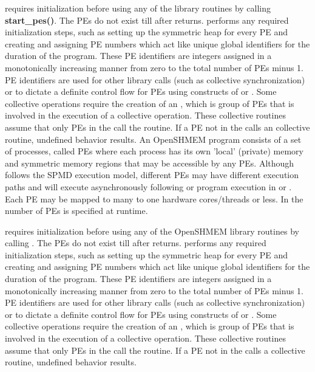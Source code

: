 \openshmem requires initialization before using any of the \openshmem library
routines by calling \textbf{start\_pes()}.  %
The \ac{PE}s do not exist till after  returns.  performs any required initialization steps, such as setting up the symmetric heap for every \ac{PE} and creating and assigning \ac{PE} numbers which act like unique global identifiers for the duration of the program. These \ac{PE} identifiers are integers assigned in a monotonically increasing manner from zero to the total number of \ac{PE}s minus 1. \ac{PE} identifiers are used for other \openshmem library calls (such as collective synchronization) or to dictate a definite control flow for \ac{PE}s using constructs of \Clang{} or \Fortran. Some collective operations require the creation of an \activeset, which is  group of \ac{PE}s that is involved in the execution of a collective operation. These collective routines assume that only \ac{PE}s in the \activeset{} call the routine. If a \ac{PE} not in the \activeset{} calls an \openshmem collective routine, undefined  behavior results.
An OpenSHMEM program consists of a set of processes, called \ac{PE}s where each process has its own 'local' (private) memory and symmetric memory regions that may be accessible by any \ac{PE}s.
Although \openshmem follows the \ac{SPMD} execution model, different \ac{PE}s may have different execution paths and will execute asynchronously following \Fortran{} or program execution in \Clang{} or \Cpp.  Each PE may be mapped to many to one hardware cores/threads or less. In \openshmem the number of \ac{PE}s is specified at runtime.

\openshmem requires initialization before using any of the OpenSHMEM library
routines by calling .%
The \ac{PE}s do not exist till after  returns.  performs any required initialization steps, such as setting up the symmetric heap for every \ac{PE} and creating and assigning \ac{PE} numbers 
which act like unique global identifiers for the duration of the program. These \ac{PE} identifiers are integers assigned in a monotonically increasing manner from zero to the total number of \ac{PE}s minus 1. \ac{PE} identifiers 
are used for other \openshmem library calls (such as collective synchronization) or to dictate a definite control flow for \ac{PE}s using constructs of \Clang{} or \Fortran{}. Some collective operations require the creation of an 
\activeset, which is  group of \ac{PE}s that is involved in the execution of a collective operation. These collective routines assume that only \ac{PE}s in the \activeset{} call the routine. If a \ac{PE} not in the \activeset{} calls a 
\openshmem collective routine, undefined  behavior results.

